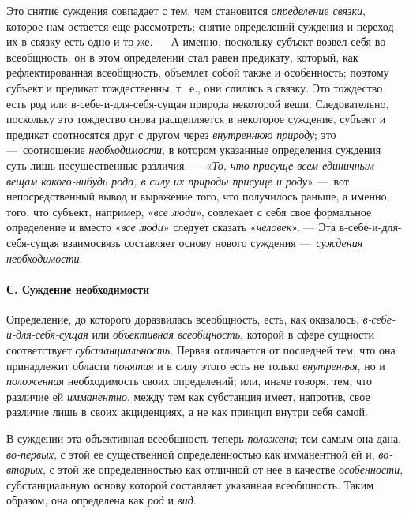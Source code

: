 \documentclass[twoside]{article}
\begin{document}
{{Это снятие суждения совпадает с тем, чем становится
{\em определение связки},
которое нам остается еще рассмотреть; снятие определений
суждения и переход их в связку есть одно и то же. — А
именно, поскольку субъект возвел себя во всеобщность, он в этом определении
стал равен предикату, который, как рефлектированная всеобщность, объемлет
собой также и особенность; поэтому субъект и предикат тождественны, т.~е.,
они слились в связку. Это тождество есть род или в-себе-и-для-себя-сущая
природа некоторой вещи. Следовательно, поскольку это тождество снова
расщепляется в некоторое суждение, субъект и предикат соотносятся друг с
другом через {\em внутреннюю
}{\em природу}; это
—~соотношение
{\em необходимости}, в
котором указанные определения суждения суть лишь несущественные различия.
— «{\em То, что присуще всем единичным
вещам какого-нибудь рода, в силу их природы присуще и роду}»
—~вот непосредственный вывод и выражение того, что получилось
раньше, а именно, того, что субъект, например,
«{\em все люди}»,
совлекает с себя свое формальное определение и вместо
«{\em все люди}» следует
сказать «{\em человек}». —
Эта в-себе-и-для-себя-сущая взаимосвязь составляет основу
нового суждения —~{\em суждения
необходимости}.

\paragraph[С. Суждение необходимости]{С. Суждение необходимости}
Определение, до которого доразвилась всеобщность, есть, как
оказалось,
{\em в-себе-и-для-себя-сущая}
или {\em объективная
всеобщность}, которой в сфере сущности соответствует
{\em субстанциальность}.
Первая отличается от последней тем, что она принадлежит
области {\em понятия} и в
силу этого есть не только
{\em внутренняя}, но и
{\em положенная}
необходимость своих определений; или, иначе говоря, тем, что
различие ей {\em имманентно},
между тем как субстанция имеет, напротив, свое различие лишь
в своих акциденциях, а не как принцип внутри себя самой.

В суждении эта объективная всеобщность теперь
{\em положена}; тем самым
она дана, {\em во-первых},
с этой ее существенной определенностью как имманентной ей и,
{\em во-вторых}, с этой
же определенностью как отличной от нее в качестве
{\em особенности},
субстанциальную основу которой составляет указанная
всеобщность. Таким образом, она определена как
{\em род} и
{\em вид}.

}}
\end{document}
